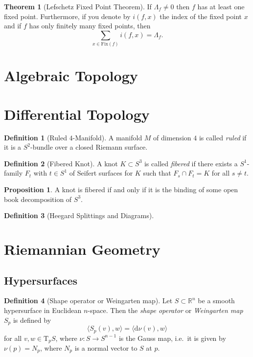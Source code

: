 \documentclass[a4paper]{article}
\newcommand{\RR}{\mathbb{R}}
\newcommand{\dd}{\mathrm{d}}
\newcommand{\lra}{\longrightarrow}
\newcommand{\ts}{\mathrm{T}}
\theoremstyle{definition}
\newtheorem{thm}{Theorem}
\newtheorem{prop}{Proposition}
\theoremstyle{definition}
\newtheorem{definition}{Definition}
\theoremstyle{remark}
\theoremstyle{remark}
\begin{document}
\begin{thm}[Lefschetz Fixed Point Theorem]
  If $\Lambda_f\neq 0$ then $f$ has at least one fixed point. Furthermore, if you denote by $i(f,x)$ the index of the fixed point $x$ and if $f$ has only finitely many fixed points, then
  \begin{equation*}
    \sum_{x\in\text{Fix}(f)}i(f,x)=\Lambda_f.
  \end{equation*}
\end{thm}

\section{Algebraic Topology}

\section{Differential Topology}

\begin{definition}[Ruled $4$-Manifold]
  A manifold $M$ of dimension $4$ is called \emph{ruled} if it is a $S^2$-bundle over a closed Riemann surface.
\end{definition}

\begin{definition}[Fibered Knot]
  A knot $K\subset S^3$ is called \emph{fibered} if there exists a $S^1$-family $F_t$ with $t\in S^1$ of Seifert surfaces for $K$ such that $F_s\cap F_t=K$ for all $s\neq t$.
\end{definition}

\begin{prop}
  A knot is fibered if and only if it is the binding of some open book decomposition of $S^3$.
\end{prop}

\begin{definition}[Heegard Splittings and Diagrams]
  
\end{definition}

\section{Riemannian Geometry}

\subsection{Hypersurfaces}

\begin{definition}[Shape operator or Weingarten map]
  Let $S\subset\RR^n$ be a smooth hypersurface in Euclidean $n$-space. Then the \emph{shape operator} or \emph{Weingarten map} $S_p$ is defined by
  \begin{equation*}
    \langle S_p(v),w\rangle=\langle \dd\nu(v),w\rangle
  \end{equation*}
  for all $v,w\in\ts_pS$, where $\nu:S\lra S^{n-1}$ is the Gauss map, i.e.\ it is given by $\nu(p)=N_p$, where $N_p$ is a normal vector to $S$ at $p$.
\end{definition}
\end{document}
